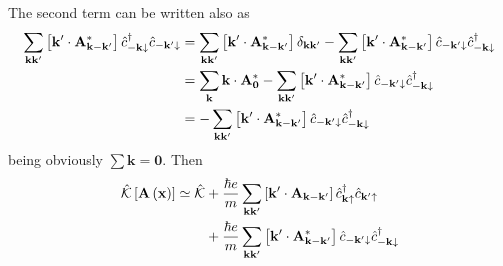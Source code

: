 The second term can be written also as
\[
\begin{aligned}
	\sum_{\mathbf{k} \mathbf{k}'} \left[{\mathbf{k}' \cdot \mathbf{A}_{\mathbf{k}-\mathbf{k}'}^*}\right] \hat{c}_{-\mathbf{k}\downarrow}^\dagger \hat{c}_{-\mathbf{k}'\downarrow} &= \sum_{\mathbf{k} \mathbf{k}'} \left[{\mathbf{k}' \cdot \mathbf{A}_{\mathbf{k}-\mathbf{k}'}^*}\right] \delta_{\mathbf{k}\mathbf{k}'} - \sum_{\mathbf{k} \mathbf{k}'} \left[{\mathbf{k}' \cdot \mathbf{A}_{\mathbf{k}-\mathbf{k}'}^*}\right] \hat{c}_{-\mathbf{k}'\downarrow} \hat{c}_{-\mathbf{k}\downarrow}^\dagger \\
	&= \sum_\mathbf{k} \mathbf{k} \cdot \mathbf{A}_\mathbf{0}^* - \sum_{\mathbf{k} \mathbf{k}'} \left[{\mathbf{k}' \cdot \mathbf{A}_{\mathbf{k}-\mathbf{k}'}^*}\right] \hat{c}_{-\mathbf{k}'\downarrow} \hat{c}_{-\mathbf{k}\downarrow}^\dagger \\
	&= - \sum_{\mathbf{k} \mathbf{k}'} \left[{\mathbf{k}' \cdot \mathbf{A}_{\mathbf{k}-\mathbf{k}'}^*}\right] \hat{c}_{-\mathbf{k}'\downarrow} \hat{c}_{-\mathbf{k}\downarrow}^\dagger
\end{aligned}
\]
being obviously $\sum \mathbf{k} = \mathbf{0}$. Then
\[
\begin{aligned}
	\hat{\mathcal{K}} \left[{\mathbf{A}\left({\mathbf{x}}\right)}\right] \simeq \hat{\mathcal{K}} &+ \frac{\hbar e}{m} \sum_{\mathbf{k} \mathbf{k}'} \left[{\mathbf{k}' \cdot \mathbf{A}_{\mathbf{k}-\mathbf{k}'} }\right] \hat{c}_{\mathbf{k}\uparrow}^\dagger \hat{c}_{\mathbf{k}'\uparrow} \\
	&+ \frac{\hbar e}{m} \sum_{\mathbf{k} \mathbf{k}'} \left[{\mathbf{k}' \cdot \mathbf{A}_{\mathbf{k}-\mathbf{k}'}^*}\right] \hat{c}_{-\mathbf{k}'\downarrow} \hat{c}_{-\mathbf{k}\downarrow}^\dagger 
\end{aligned}
\]

